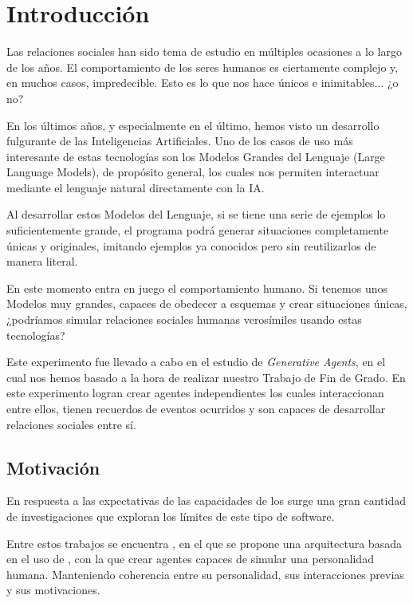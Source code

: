 \chapter{Introducción}
\label{cap:introduccion}


Las relaciones sociales han sido tema de estudio en múltiples ocasiones a lo largo de los años. El comportamiento de los seres humanos es ciertamente complejo y, en muchos casos, impredecible. Esto es lo que nos hace únicos e inimitables... ¿o no?

En los últimos años, y especialmente en el último, hemos visto un desarrollo fulgurante de las Inteligencias Artificiales. Uno de los casos de uso más interesante de estas tecnologías son los Modelos Grandes del Lenguaje (Large Language Models), de propósito general, los cuales nos permiten interactuar mediante el lenguaje natural directamente con la IA.

Al desarrollar estos Modelos del Lenguaje, si se tiene una serie de ejemplos lo suficientemente grande, el programa podrá generar situaciones completamente únicas y originales, imitando ejemplos ya conocidos pero sin reutilizarlos de manera literal.

En este momento entra en juego el comportamiento humano. Si tenemos unos Modelos muy grandes, capaces de obedecer a esquemas y crear situaciones únicas, ¿podríamos simular relaciones sociales humanas verosímiles usando estas tecnologías?

Este experimento fue llevado a cabo en el estudio de \textit{Generative Agents}, en el cual nos hemos basado a la hora de realizar nuestro Trabajo de Fin de Grado. En este experimento logran crear agentes independientes los cuales interaccionan entre ellos, tienen recuerdos de eventos ocurridos y son capaces de desarrollar relaciones sociales entre sí.

\section{Motivación}
En respuesta a las expectativas de las capacidades de los \mgl surge una gran cantidad de investigaciones que exploran los límites de este tipo de software.

Entre estos trabajos se encuentra \ga, en el que se propone una arquitectura basada en el uso de \mgl, con la que crear agentes capaces de simular una personalidad humana. Manteniendo coherencia entre su personalidad, sus interacciones previas y sus motivaciones.

